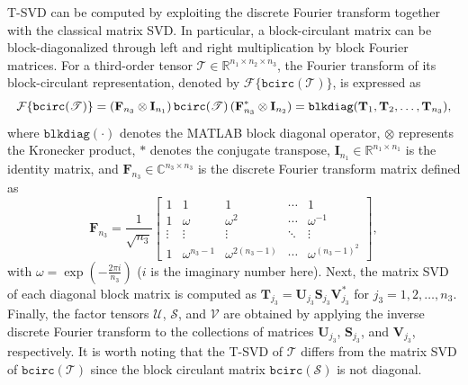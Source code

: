 \documentclass[onefignum,onetabnum]{siamart250211}
\begin{document}
T-SVD can be computed  by exploiting the discrete Fourier transform together with the classical matrix SVD. In particular, a block-circulant matrix can be block-diagonalized through left and right multiplication by block Fourier matrices. For a third-order tensor $\mathscr{T}\in\mathbb{R}^{n_1\times n_2\times n_3}$, the Fourier transform of its block-circulant representation, denoted by $\mathcal{F}{\{\texttt{bcirc}(\mathscr{T})\}}$, is expressed as
\begin{equation}\label{eq:fourier_def}
\scalebox{0.98}{$\mathcal{F}\{\texttt{bcirc}(\mathscr{T})\} = (\textbf{F}_{n_3} \otimes \textbf{I}_{n_1}) \, \texttt{bcirc}(\mathscr{T}) \, (\textbf{F}_{n_3}^{*} \otimes \textbf{I}_{n_2})
= \texttt{blkdiag}(\textbf{T}_1,\textbf{T}_2, \dots, \textbf{T}_{n_3}),$}
\end{equation}
where $\texttt{blkdiag}(\cdot)$ denotes the MATLAB block diagonal operator, $\otimes$ represents the Kronecker product, $*$ denotes the conjugate transpose, 
$\textbf{I}_{n_1}\in\mathbb{R}^{n_1\times n_1}$ is the identity matrix, and $\textbf{F}_{n_3} \in \mathbb{C}^{n_3 \times n_3}$ is the discrete Fourier transform matrix defined as
\begin{equation*}
\textbf{F}_{n_3} = \frac{1}{\sqrt{n_3}} 
\begin{bmatrix}
1 & 1 & 1 & \cdots & 1 \\
1 & \omega & \omega^2 & \cdots & \omega^{-1} \\
\vdots & \vdots & \vdots & \ddots & \vdots \\
1 & \omega^{n_3-1} & \omega^{2(n_3-1)} & \cdots & \omega^{(n_3-1)^2}
\end{bmatrix},
\end{equation*}
with $\omega = \exp(-\frac{2\pi i}{n_3})$ ($i$ is the imaginary number here). Next, the matrix SVD of each diagonal block matrix is computed as $\textbf{T}_{j_3}=\textbf{U}_{j_3}\textbf{S}_{j_3}\textbf{V}_{j_3}^*$ for $j_3=1,2,\dots, n_3$. Finally, the factor tensors $\mathscr{U}$, $\mathscr{S}$, and $\mathscr{V}$ are obtained by applying the inverse discrete Fourier transform to the collections of matrices ${\textbf{U}_{j_3}}$, ${\textbf{S}_{j_3}}$, and ${\textbf{V}_{j_3}}$, respectively. It is worth noting that the T-SVD of $\mathscr{T}$ differs from the matrix SVD of $\texttt{bcirc}(\mathscr{T})$ since the block circulant matrix $\texttt{bcirc}(\mathscr{S})$ is not
diagonal.
\end{document}

